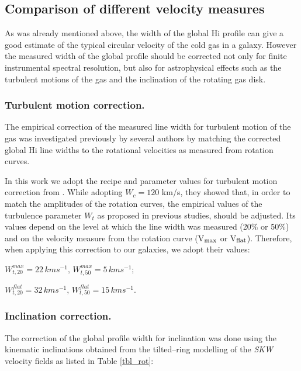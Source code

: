 \documentclass[usenatbib,useAMS]{mnras}
\begin{document}
\subsection{Comparison of different velocity measures}

As was already mentioned above, the width of the global H{\sc i} profile
can give a good estimate of the typical circular velocity of the cold
gas in a galaxy.  However the measured width of the global profile
should be corrected not only for finite instrumental spectral
resolution, but also for astrophysical effects such as the turbulent
motions of the gas and the inclination of the rotating gas disk. 

\subsubsection{Turbulent motion correction.} 

The empirical correction of the measured line width for turbulent motion
of the gas was investigated previously by several authors
\citep{bottinelli83, broeils92, rhee96} by matching the corrected global
H{\sc i} line widths to the rotational velocities as measured from
rotation curves. 

In this work we adopt the recipe and parameter values for turbulent
motion correction from \citet{versanc01}.  While adopting $W_{c}=120$
km/s, they showed that, in order to match the amplitudes of the rotation
curves, the empirical values of the turbulence parameter $W_{t}$ as
proposed in previous studies, should be adjusted.  Its values depend on
the level at which the line width was measured (20\% or 50\%) and on the
velocity measure from the rotation curve (V$_{\rm max}$ or V$_{\rm
flat}$).  Therefore, when applying this correction to our galaxies, we
adopt their values: \newline

$W_{t,20}^{max} = 22\,kms^{-1}, \, W_{t,50}^{max} = 5\,kms^{-1}$;
\newline

$W_{t,20}^{flat} = 32\,kms^{-1}, \, W_{t,50}^{flat} = 15\,kms^{-1}$.
\newline

\subsubsection{Inclination correction.} 

The correction of the global profile width for inclination was done
using the kinematic inclinations obtained from the tilted--ring
modelling of the {\it SKW} velocity fields as listed in Table \ref{tbl_rot}:
\newline
\end{document}
